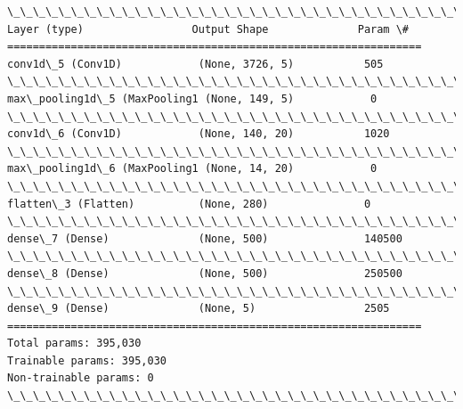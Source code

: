 \documentclass[11pt]{article}
\begin{document}
    \begin{Verbatim}[commandchars=\\\{\}]
\_\_\_\_\_\_\_\_\_\_\_\_\_\_\_\_\_\_\_\_\_\_\_\_\_\_\_\_\_\_\_\_\_\_\_\_\_\_\_\_\_\_\_\_\_\_\_\_\_\_\_\_\_\_\_\_\_\_\_\_\_\_\_\_\_
Layer (type)                 Output Shape              Param \#   
=================================================================
conv1d\_5 (Conv1D)            (None, 3726, 5)           505       
\_\_\_\_\_\_\_\_\_\_\_\_\_\_\_\_\_\_\_\_\_\_\_\_\_\_\_\_\_\_\_\_\_\_\_\_\_\_\_\_\_\_\_\_\_\_\_\_\_\_\_\_\_\_\_\_\_\_\_\_\_\_\_\_\_
max\_pooling1d\_5 (MaxPooling1 (None, 149, 5)            0         
\_\_\_\_\_\_\_\_\_\_\_\_\_\_\_\_\_\_\_\_\_\_\_\_\_\_\_\_\_\_\_\_\_\_\_\_\_\_\_\_\_\_\_\_\_\_\_\_\_\_\_\_\_\_\_\_\_\_\_\_\_\_\_\_\_
conv1d\_6 (Conv1D)            (None, 140, 20)           1020      
\_\_\_\_\_\_\_\_\_\_\_\_\_\_\_\_\_\_\_\_\_\_\_\_\_\_\_\_\_\_\_\_\_\_\_\_\_\_\_\_\_\_\_\_\_\_\_\_\_\_\_\_\_\_\_\_\_\_\_\_\_\_\_\_\_
max\_pooling1d\_6 (MaxPooling1 (None, 14, 20)            0         
\_\_\_\_\_\_\_\_\_\_\_\_\_\_\_\_\_\_\_\_\_\_\_\_\_\_\_\_\_\_\_\_\_\_\_\_\_\_\_\_\_\_\_\_\_\_\_\_\_\_\_\_\_\_\_\_\_\_\_\_\_\_\_\_\_
flatten\_3 (Flatten)          (None, 280)               0         
\_\_\_\_\_\_\_\_\_\_\_\_\_\_\_\_\_\_\_\_\_\_\_\_\_\_\_\_\_\_\_\_\_\_\_\_\_\_\_\_\_\_\_\_\_\_\_\_\_\_\_\_\_\_\_\_\_\_\_\_\_\_\_\_\_
dense\_7 (Dense)              (None, 500)               140500    
\_\_\_\_\_\_\_\_\_\_\_\_\_\_\_\_\_\_\_\_\_\_\_\_\_\_\_\_\_\_\_\_\_\_\_\_\_\_\_\_\_\_\_\_\_\_\_\_\_\_\_\_\_\_\_\_\_\_\_\_\_\_\_\_\_
dense\_8 (Dense)              (None, 500)               250500    
\_\_\_\_\_\_\_\_\_\_\_\_\_\_\_\_\_\_\_\_\_\_\_\_\_\_\_\_\_\_\_\_\_\_\_\_\_\_\_\_\_\_\_\_\_\_\_\_\_\_\_\_\_\_\_\_\_\_\_\_\_\_\_\_\_
dense\_9 (Dense)              (None, 5)                 2505      
=================================================================
Total params: 395,030
Trainable params: 395,030
Non-trainable params: 0
\_\_\_\_\_\_\_\_\_\_\_\_\_\_\_\_\_\_\_\_\_\_\_\_\_\_\_\_\_\_\_\_\_\_\_\_\_\_\_\_\_\_\_\_\_\_\_\_\_\_\_\_\_\_\_\_\_\_\_\_\_\_\_\_\_

    \end{Verbatim}

    \begin{center}
    \end{center}
    { \hspace*{\fill} \\}
    
    \begin{center}
    \end{center}
    { \hspace*{\fill} \\}
    
\end{document}
